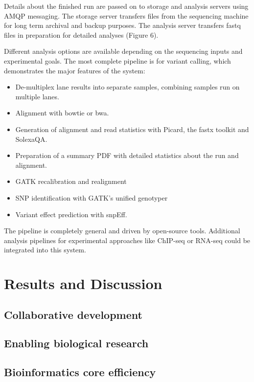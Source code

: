 \documentclass[10pt]{bmc_article}
\newenvironment{bmcformat}{\begin{raggedright}\baselineskip20pt\sloppy\setboolean{publ}{false}}{\end{raggedright}\baselineskip20pt\sloppy}
\begin{document}
\begin{bmcformat}
Details about the finished run are passed on to storage and analysis
servers using AMQP messaging. The storage server transfers files from
the sequencing machine for long term archival and backup purposes. The
analysis server transfers fastq files in preparation for detailed
analyses (Figure 6).

Different analysis options are available depending on the sequencing
inputs and experimental goals. The most complete pipeline is for
variant calling, which demonstrates the major features of the system:

\begin{itemize}
  \item De-multiplex lane results into separate samples, combining
    samples run on multiple lanes.
  \item Alignment with bowtie or bwa.
  \item Generation of alignment and read statistics with Picard, the
    fastx toolkit and SolexaQA.
  \item Preparation of a summary PDF with detailed statistics
    about the run and alignment.
  \item GATK recalibration and realignment
  \item SNP identification with GATK’s unified genotyper
  \item Variant effect prediction with snpEff.
\end{itemize}

The pipeline is completely general and driven by open-source tools.
Additional analysis pipelines for experimental approaches like
ChIP-seq or RNA-seq could be integrated into this system.

\section*{Results and Discussion}

\subsection*{Collaborative development}

\subsection*{Enabling biological research}

\subsection*{Bioinformatics core efficiency}


\end{bmcformat}
\end{document}
